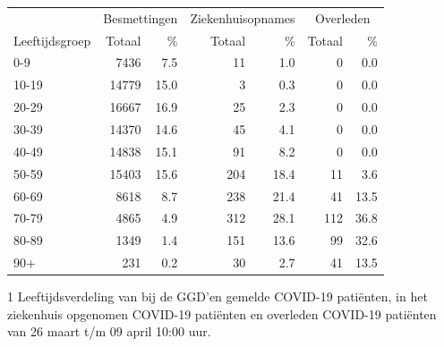 \documentclass[
  english,
  man,floatsintext]{apa6}
\begin{document}
\begin{table}
\centering\begingroup\fontsize{11}{13}\selectfont

\begin{threeparttable}
\begin{tabular}{lrrrrrr}
\toprule
\multicolumn{1}{c}{ } & \multicolumn{2}{c}{Besmettingen} & \multicolumn{2}{c}{Ziekenhuisopnames} & \multicolumn{2}{c}{Overleden} \\
\cmidrule(l{3pt}r{3pt}){2-3} \cmidrule(l{3pt}r{3pt}){4-5} \cmidrule(l{3pt}r{3pt}){6-7}
Leeftijdsgroep & Totaal & \% & Totaal & \% & Totaal & \%\\
\midrule
0-9 & 7436 & 7.5 & 11 & 1.0 & 0 & 0.0\\
10-19 & 14779 & 15.0 & 3 & 0.3 & 0 & 0.0\\
20-29 & 16667 & 16.9 & 25 & 2.3 & 0 & 0.0\\
30-39 & 14370 & 14.6 & 45 & 4.1 & 0 & 0.0\\
40-49 & 14838 & 15.1 & 91 & 8.2 & 0 & 0.0\\
50-59 & 15403 & 15.6 & 204 & 18.4 & 11 & 3.6\\
60-69 & 8618 & 8.7 & 238 & 21.4 & 41 & 13.5\\
70-79 & 4865 & 4.9 & 312 & 28.1 & 112 & 36.8\\
80-89 & 1349 & 1.4 & 151 & 13.6 & 99 & 32.6\\
90+ & 231 & 0.2 & 30 & 2.7 & 41 & 13.5\\
\bottomrule
\end{tabular}
\begin{tablenotes}
\item[1] Leeftijdsverdeling van bij de GGD’en gemelde COVID-19 patiënten, in het ziekenhuis opgenomen COVID-19 patiënten en overleden COVID-19 patiënten van 26 maart t/m 09 april 10:00 uur.
\end{tablenotes}
\end{threeparttable}
\endgroup{}
\end{table}

\newpage
\end{document}
